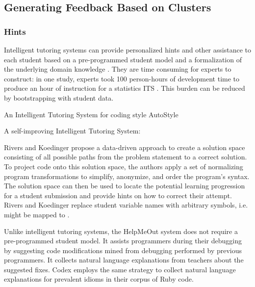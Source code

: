 \subsection{Generating Feedback Based on Clusters}

\subsubsection{Hints}
Intelligent tutoring systems can provide personalized hints and other assistance to each student based on a pre-programmed student model and a formalization of the underlying domain knowledge \cite{gross2012feedback}. They are time consuming for experts to construct: in one study, experts took 100 person-hours of development time to produce an hour of instruction for a statistics ITS \cite{murray2003authoring}. This burden can be reduced by bootstrapping with student data.

An Intelligent Tutoring System for coding style
AutoStyle

A self-improving Intelligent Tutoring System:

Rivers and Koedinger \citeyear{riversaied} propose a data-driven approach to create a solution space consisting of all possible paths from the problem statement to a correct solution. To project code onto this solution space, the authors apply a set of normalizing program transformations to simplify, anonymize, and order the program’s syntax. The solution space can then be used to locate the potential learning progression for a student submission and provide hints on how to correct their attempt. Rivers and Koedinger replace student variable names with arbitrary symbols, i.e.  might be mapped to . 

Unlike intelligent tutoring systems, the HelpMeOut system \cite{helpmeout} does not require a pre-programmed student model. It assists programmers during their debugging by suggesting code modifications mined from debugging performed by previous programmers. It collects natural language explanations from teachers about the suggested fixes. Codex \cite{codex} employs the same strategy to collect natural language explanations for prevalent idioms in their corpus of Ruby code.

